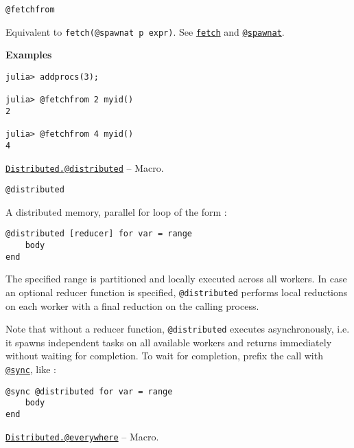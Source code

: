 \begin{adjustwidth}{2em}{0pt}


\begin{verbatim}
@fetchfrom
\end{verbatim}

Equivalent to \texttt{fetch(@spawnat p expr)}. See \hyperlink{11007884648860062495}{\texttt{fetch}} and \hyperlink{11231712027010946923}{\texttt{@spawnat}}.

\textbf{Examples}


\begin{verbatim}
julia> addprocs(3);

julia> @fetchfrom 2 myid()
2

julia> @fetchfrom 4 myid()
4
\end{verbatim}



\end{adjustwidth}
\hypertarget{4581929266257108937}{} 
\hyperlink{4581929266257108937}{\texttt{Distributed.@distributed}}  -- {Macro.}

\begin{adjustwidth}{2em}{0pt}


\begin{verbatim}
@distributed
\end{verbatim}

A distributed memory, parallel for loop of the form :


\begin{lstlisting}
@distributed [reducer] for var = range
    body
end
\end{lstlisting}

The specified range is partitioned and locally executed across all workers. In case an optional reducer function is specified, \texttt{@distributed} performs local reductions on each worker with a final reduction on the calling process.

Note that without a reducer function, \texttt{@distributed} executes asynchronously, i.e. it spawns independent tasks on all available workers and returns immediately without waiting for completion. To wait for completion, prefix the call with \hyperlink{7188613740509403855}{\texttt{@sync}}, like :


\begin{lstlisting}
@sync @distributed for var = range
    body
end
\end{lstlisting}



\end{adjustwidth}
\hypertarget{4972064255482407966}{} 
\hyperlink{4972064255482407966}{\texttt{Distributed.@everywhere}}  -- {Macro.}

